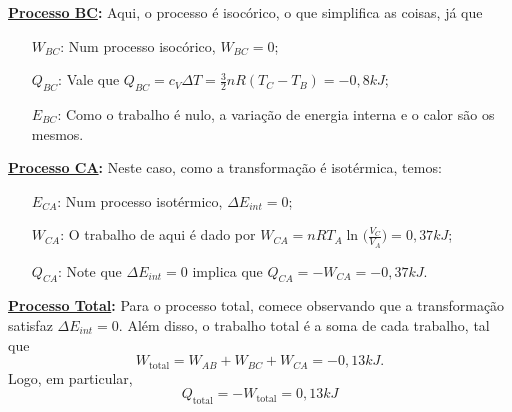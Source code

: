 \documentclass[phsyicsII_notes.tex]{subfiles}
\begin{document}
\begin{example}
	\textbf{\underline{Processo BC}:} Aqui, o processo é isocórico, o que simplifica as coisas, já que
	\begin{itemize}
		\item[\(W_{BC}\):] Num processo isocórico, \(W_{BC} = 0\);
		\item[\(Q_{BC}\):] Vale que \(Q_{BC} = c_{V}\Delta T = \frac{3}{2}nR(T_{C} - T_{B}) = - 0,8kJ\);
		\item[\(E_{BC}\):] Como o trabalho é nulo, a variação de energia interna e o calor são os mesmos.
	\end{itemize}

	\textbf{\underline{Processo CA}:} Neste caso, como a transformação é isotérmica, temos:
	\begin{itemize}
		\item[\(E_{CA}\):] Num processo isotérmico, \(\Delta E_{int} = 0\);
		\item[\(W_{CA}\):] O trabalho de aqui é dado por \(W_{CA} = nRT_{A}\ln^{}{\biggl(\frac{V_{C}}{V_{A}}\biggr)} = 0,37kJ\);
		\item[\(Q_{CA}\):] Note que \(\Delta E_{int} = 0\) implica que \(Q_{CA} = - W_{CA} = -0,37kJ\).
	\end{itemize}

	\textbf{\underline{Processo Total}:} Para o processo total, comece observando que a transformação
	satisfaz \(\Delta E_{int} = 0\). Além disso, o trabalho total é a soma de cada trabalho, tal que
	\[
		W_{\text{total}} = W_{AB} + W_{BC} + W_{CA} = -0,13kJ.
	\]
	Logo, em particular,
	\[
		Q_{\text{total}} = - W_{\text{total}} = 0,13kJ
	\]
\end{example}
\end{document}
